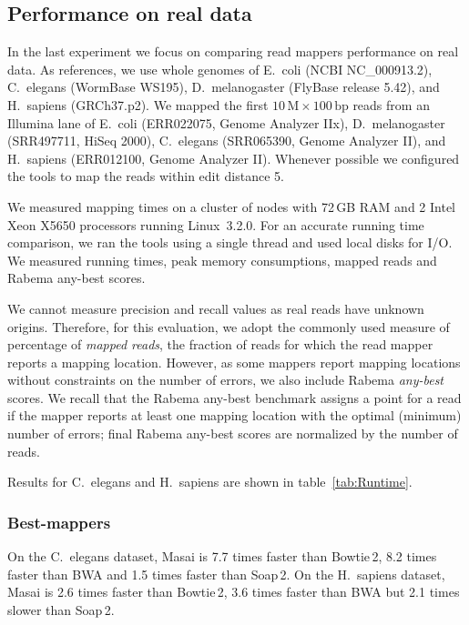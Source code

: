 \subsection{Performance on real data}

In the last experiment we focus on comparing read mappers performance on real data.
As references, we use whole genomes of E.~coli (NCBI NC\_000913.2), C.~elegans (WormBase WS195), D.~melanogaster (FlyBase release 5.42), and H.~sapiens (GRCh37.p2).
We mapped the first $10\,\text{M}\times 100\,\text{bp}$ reads from an Illumina lane of E.~coli (ERR022075, Genome Analyzer IIx), D.~melanogaster (SRR497711, HiSeq 2000), C.~elegans (SRR065390, Genome Analyzer II), and H.~sapiens (ERR012100, Genome Analyzer II).
Whenever possible we configured the tools to map the reads within edit distance 5.

We measured mapping times on a cluster of nodes with 72\,GB RAM and 2 Intel Xeon X5650 processors running Linux~3.2.0.
For an accurate running time comparison, we ran the tools using a single thread and used local disks for I/O.
We measured running times, peak memory consumptions, mapped reads and Rabema any-best scores.

We cannot measure precision and recall values as real reads have unknown origins.
Therefore, for this evaluation, we adopt the commonly used measure of percentage of \emph{mapped reads}, \ie the fraction of reads for which the read mapper reports a mapping location.
However, as some mappers report mapping locations without constraints on the number of errors, we also include Rabema \emph{any-best} scores.
We recall that the Rabema any-best benchmark assigns a point for a read if the mapper reports at least one mapping location with the optimal (minimum) number of errors;
final Rabema any-best scores are normalized by the number of reads.

Results for C.~elegans and H.~sapiens are shown in table~\ref{tab:Runtime}.

\subsubsection{Best-mappers}
On the C.~elegans dataset, Masai is 7.7 times faster than Bowtie\,2, 8.2 times faster than BWA and 1.5 times faster than Soap\,2.
On the H.~sapiens dataset, Masai is 2.6 times faster than Bowtie\,2, 3.6 times faster than BWA but 2.1 times slower than Soap\,2.

